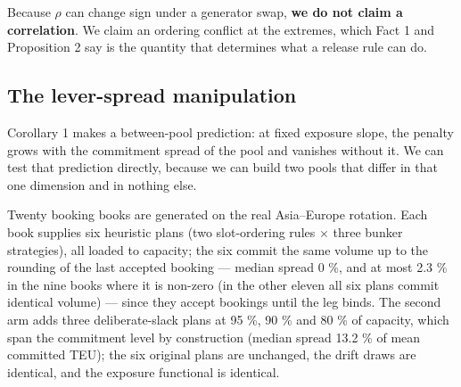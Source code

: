 \documentclass[preprint,12pt,letterpaper]{elsarticle}
\theoremstyle{definition}
\theoremstyle{plain}
\begin{document}
Because $\rho$ can change sign under a generator swap, \textbf{we do not claim a correlation}. We claim an ordering conflict at the extremes, which Fact 1 and Proposition 2 say is the quantity that determines what a release rule can do.

\subsection{The lever-spread manipulation}

Corollary 1 makes a between-pool prediction: at fixed exposure slope, the penalty grows with the commitment spread of the pool and vanishes without it. We can test that prediction directly, because we can build two pools that differ in that one dimension and in nothing else.

Twenty booking books are generated on the real Asia--Europe rotation. Each book supplies six heuristic plans (two slot-ordering rules $\times$ three bunker strategies), all loaded to capacity; the six commit the same volume up to the rounding of the last accepted booking --- median spread 0 \%, and at most 2.3 \% in the nine books where it is non-zero (in the other eleven all six plans commit identical volume) --- since they accept bookings until the leg binds. The second arm adds three deliberate-slack plans at 95 \%, 90 \% and 80 \% of capacity, which span the commitment level by construction (median spread 13.2 \% of mean committed TEU); the six original plans are unchanged, the drift draws are identical, and the exposure functional is identical.
\end{document}
